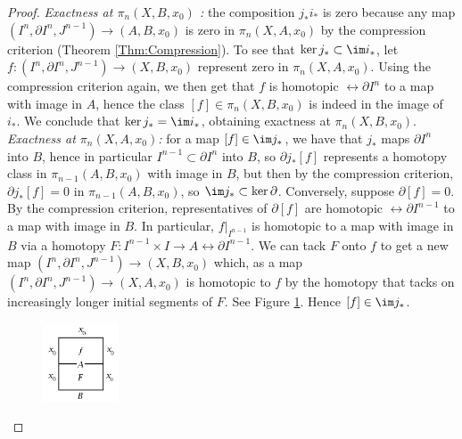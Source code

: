   \begin{proof}
      \textit{Exactness at $\pi_n
      \left( X,B,x_0 \right) $ :} the composition
      $j_* i_*$ is zero because any
      map $\left( I^{n}, \partial I^{n},
      J^{n-1}\right) \to \left( A,B,x_0 \right) $ 
      is zero in $\pi_n \left( X, A, x_0 \right) $ by the
      compression criterion (Theorem \ref{Thm:Compression}).
      To see that $\ker j_* \subset 
      \im i_*$, let
      $f \colon \left( I^{n}, \partial I^{n},
      J^{n-1}\right) \to \left( X, B, x_0 \right) $ 
      represent zero in $\pi_n \left( X, A, x_0 \right) $.
      Using the compression criterion again, we
      then get that $f$ is homotopic $\rel \partial I^{n}$ 
      to a map with image in $A$, hence the class
      $\left[ f \right] \in \pi_n \left( X, B, x_0 \right) $ 
      is indeed in the image of $i_*$. We conclude that
      $\ker j_* = \im i_*$, obtaining exactness
      at $\pi_n \left( X,B, x_0 \right) $.\\
      \textit{Exactness at $\pi_n (X,A,x_0)$:} 
      for a map  $\left[ f \right] 
      \in \im j_*$, we have that
      $j_*$ maps $\partial I^{n}$ into $B$, hence
      in particular $I^{n-1} \subset \partial I^{n}$ into
      $B$, so $\partial j_* \left[ f \right] $ 
      represents a homotopy class
      in $\pi_{n-1}\left( A,B,x_0 \right) $ with
      image in $B$, but then by the compression criterion,
      $\partial j_* \left[ f \right] = 0$ in
      $\pi_{n-1} \left( A,B,x_0 \right) $, so
      $\im j_* \subset \ker \partial $.
      Conversely, suppose
      $\partial \left[ f \right] = 0$. By the compression
      criterion, representatives of $\partial \left[ f \right] $
      are homotopic $\rel \partial I^{n-1}$ to a map
      with image in $B$. In particular,
      $f|_{I^{n-1}}$ is homotopic to a map with
      image in $B$ via a homotopy $F \colon
      I^{n-1} \times I \to A \rel \partial I^{n-1}$.
      We can tack $F$ onto $f$ to get a new map
      $\left( I^{n}, \partial I^{n},
      J^{n-1}\right) \to 
      \left( X, B, x_0 \right) $ which, as
      a map
      $\left( I^{n}, \partial I^{n}, J^{n-1} \right) \to 
      \left( X, A, x_0 \right) $ is homotopic to
      $f$ by the homotopy that tacks on increasingly longer
      initial segments of $F$. See Figure
      \ref{fig:IDIWKAKX-png}. Hence
      $\left[ f \right] \in \im j_*$.

      \begin{figure}[htpb]
          \centering
          \includegraphics[width=0.2\textwidth]{Figures/IDIWKAKX.png}
          \caption{}
          \label{fig:IDIWKAKX-png}
      \end{figure}


\end{proof}
